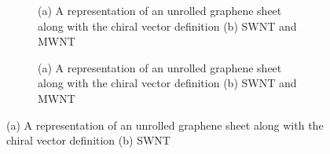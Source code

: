 
\begin{figure}[htbp]
  \centering
  \begin{subfigure}[b]{0.48\linewidth}
    \centering
    \caption{(a) A representation of an unrolled graphene sheet along with the chiral vector definition (b) SWNT and MWNT}

  \end{subfigure}
  \hfill
  \begin{subfigure}[b]{0.48\linewidth}
    \centering
    \caption{(a) A representation of an unrolled graphene sheet along with the chiral vector definition (b) SWNT and MWNT}

  \end{subfigure}
  \caption{(a) A representation of an unrolled graphene sheet along with the chiral vector definition (b) SWNT}

  \label{fig:group_tfvnf}
\end{figure}

